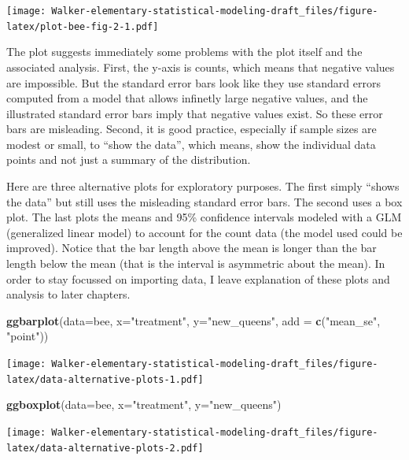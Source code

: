 \documentclass[]{book}
\newenvironment{Shaded}{\begin{snugshade}}{\end{snugshade}}
\newcommand{\KeywordTok}[1]{\textcolor[rgb]{0.13,0.29,0.53}{\textbf{#1}}}
\newcommand{\DataTypeTok}[1]{\textcolor[rgb]{0.13,0.29,0.53}{#1}}
\newcommand{\StringTok}[1]{\textcolor[rgb]{0.31,0.60,0.02}{#1}}
\newcommand{\NormalTok}[1]{#1}
\begin{document}
\texttt{[image: Walker-elementary-statistical-modeling-draft\_files/figure-latex/plot-bee-fig-2-1.pdf]}

The plot suggests immediately some problems with the plot itself and the
associated analysis. First, the y-axis is counts, which means that
negative values are impossible. But the standard error bars look like
they use standard errors computed from a model that allows infinetly
large negative values, and the illustrated standard error bars imply
that negative values exist. So these error bars are misleading. Second,
it is good practice, especially if sample sizes are modest or small, to
``show the data'', which means, show the individual data points and not
just a summary of the distribution.

Here are three alternative plots for exploratory purposes. The first
simply ``shows the data'' but still uses the misleading standard error
bars. The second uses a box plot. The last plots the means and 95\%
confidence intervals modeled with a GLM (generalized linear model) to
account for the count data (the model used could be improved). Notice
that the bar length above the mean is longer than the bar length below
the mean (that is the interval is asymmetric about the mean). In order
to stay focussed on importing data, I leave explanation of these plots
and analysis to later chapters.

\begin{Shaded}
\begin{Highlighting}[]
\KeywordTok{ggbarplot}\NormalTok{(}\DataTypeTok{data=}\NormalTok{bee, }\DataTypeTok{x=}\StringTok{"treatment"}\NormalTok{, }\DataTypeTok{y=}\StringTok{"new_queens"}\NormalTok{, }\DataTypeTok{add =} \KeywordTok{c}\NormalTok{(}\StringTok{"mean_se"}\NormalTok{, }\StringTok{"point"}\NormalTok{))}
\end{Highlighting}
\end{Shaded}

\texttt{[image: Walker-elementary-statistical-modeling-draft\_files/figure-latex/data-alternative-plots-1.pdf]}

\begin{Shaded}
\begin{Highlighting}[]
\KeywordTok{ggboxplot}\NormalTok{(}\DataTypeTok{data=}\NormalTok{bee, }\DataTypeTok{x=}\StringTok{"treatment"}\NormalTok{, }\DataTypeTok{y=}\StringTok{"new_queens"}\NormalTok{)}
\end{Highlighting}
\end{Shaded}

\texttt{[image: Walker-elementary-statistical-modeling-draft\_files/figure-latex/data-alternative-plots-2.pdf]}
\end{document}
